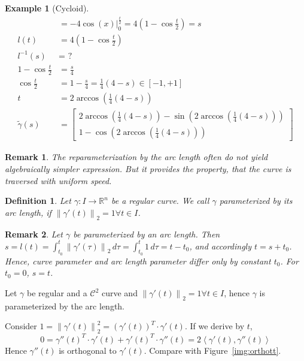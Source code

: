 \documentclass{article}
\newtheorem{example}{Example}  \numberwithin{example}{section}
\newtheorem{definition}{Definition}  \numberwithin{definition}{section}
\newtheorem{remark}{Remark}  \numberwithin{remark}{section}
\newcommand{\angel}[1]{\left\langle#1\right\rangle}
\newcommand{\norm}[1]{\left\|#1\right\|}
\begin{document}
\begin{example}[Cycloid]
\begin{align*}
      &= -4 \cos(x) |_0^{\frac t2} = 4 \left(1 - \cos\frac t2\right) = s \\
    l(t) &= 4 \left(1 - \cos\frac t2\right) \\
    l^{-1}(s) &= \text{ ?} \\
    1 - \cos\frac t2 &= \frac s4 \\
    \cos\frac t2 &= 1 - \frac s4 = \frac14 (4 - s) \in [-1, +1] \\
    t &= 2 \arccos\left(\frac14 (4 - s)\right) \\
    \tilde \gamma(s) &= \begin{bmatrix}
      2 \arccos\left(\frac14 (4 - s)\right) - \sin\left(2 \arccos\left(\frac14 (4 - s)\right)\right) \\
      1 - \cos\left(2 \arccos\left(\frac14(4 - s)\right)\right)
    \end{bmatrix}
  \end{align*}
\end{example}

\begin{remark}
  The reparameterization by the arc length often do not yield algebraically simpler expression.
  But it provides the property, that the curve is traversed with uniform speed.
\end{remark}

\begin{definition} %
  Let $\gamma: I \to \mathbb R^n$ be a regular curve.
  We call $\gamma$ \emph{parameterized by its arc length}, if $\norm{\gamma'(t)}_2 = 1 \forall t \in I$.
\end{definition}

\begin{remark}
  Let $\gamma$ be parameterized by an arc length.
  Then $s = l(t) = \int_{t_0}^t \norm{\gamma'(\tau)}_2 \, d\tau = \int_{t_0}^t 1 \, d\tau = t - t_0$, and accordingly $t = s + t_0$.
  Hence, curve parameter and arc length parameter differ only by constant $t_0$. For $t_0 = 0$, $s = t$.
\end{remark}

Let $\gamma$ be regular and a $\mathcal C^2$ curve and $\norm{\gamma'(t)}_2 = 1 \forall t \in I$, hence $\gamma$ is parameterized by the arc length.

Consider $1 = \norm{\gamma'(t)}_2^2 = \left(\gamma'(t)\right)^T \cdot \gamma'(t)$. If we derive by $t$,
\[ 0 = \gamma''(t)^T \cdot \gamma'(t) + \gamma'(t)^T \cdot \gamma''(t) = 2 \angel{\gamma'(t), \gamma''(t)} \]
Hence $\gamma''(t)$ is orthogonal to $\gamma'(t)$. Compare with Figure~\ref{img:orthott}.
\end{document}
